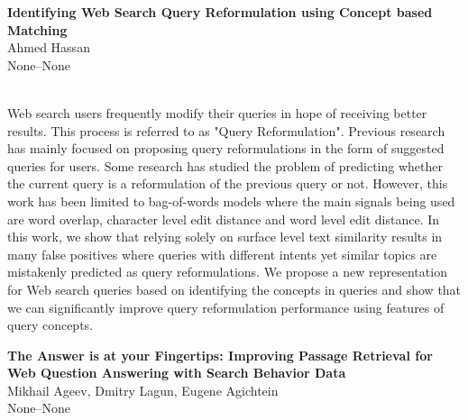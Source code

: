 \documentclass[twoside,makeidx]{book}
\begin{document}
\par\vspace{2em}\noindent%
\begin{minipage}{\linewidth}%
\begin{center}
\textbf{\normalsize Identifying Web Search Query Reformulation using Concept based Matching}\\
\normalsize  Ahmed Hassan\\
{\small None--None}\\
\end{center}
\end{minipage}\\[0.5em]
\nopagebreak%
\noindent%
{\small Web search users frequently modify their queries in hope of receiving better results. This process is referred to as "Query Reformulation". Previous research has mainly focused on proposing query reformulations in the form of suggested queries for users. Some research has studied the problem of predicting whether the current query is a reformulation of the previous query or not. However, this work has been limited to bag-of-words models where the main signals being used are word overlap, character level edit distance and word level edit distance. In this work, we show that relying solely on surface level text similarity results in many false positives where queries with different intents yet similar topics  are mistakenly predicted as query reformulations. We propose a new representation for Web search queries based on identifying the concepts in queries and show that we can significantly improve query reformulation performance using features of query concepts.}
\par\vspace{2em}\noindent%
\begin{minipage}{\linewidth}%
\begin{center}
\textbf{\normalsize The Answer is at your Fingertips: Improving Passage Retrieval for Web Question Answering with Search Behavior Data}\\
\normalsize  Mikhail Ageev,  Dmitry Lagun,  Eugene Agichtein\\
{\small None--None}\\
\end{center}
\end{minipage}\\[0.5em]
\nopagebreak%
\noindent%
\end{document}
